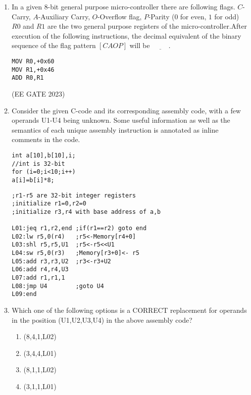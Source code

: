 \begin{enumerate}
\item In a given $8$-bit general purpose micro-controller there are following flags. $C$-Carry, $A$-Auxiliary Carry, $O$-Overflow flag, $P$-Parity ($0$ for even, $1$ for odd) $R0$ and $R1$ are the two general purpose registers of the micro-controller.After execution of the following instructions, the decimal equivalent of the binary sequence of the flag pattern $[CAOP]$ will be $\underline{\hspace{1cm}}$.\\


\begin{lstlisting}
MOV R0,+0x60
MOV R1,+0x46 
ADD R0,R1
\end{lstlisting}
    
\hfill{(EE GATE 2023)}\\


\item 
Consider the given C-code and its corresponding assembly code, with a few operands U1-U4 being unknown. Some useful information as well as the semantics of each unique assembly instruction is annotated as inline comments in the code.  

\begin{lstlisting}
int a[10],b[10],i;
//int is 32-bit
for (i=0;i<10;i++)
a[i]=b[i]*8;
\end{lstlisting}

\begin{lstlisting}
;r1-r5 are 32-bit integer registers
;initialize r1=0,r2=0
;initialize r3,r4 with base address of a,b

L01:jeq r1,r2,end ;if(r1==r2) goto end
L02:lw r5,0(r4)   ;r5<-Memory[r4+0]
L03:shl r5,r5,U1  ;r5<-r5<<U1
L04:sw r5,0(r3)   ;Memory[r3+0]<- r5
L05:add r3,r3,U2  ;r3<-r3+U2
L06:add r4,r4,U3
L07:add r1,r1,1
L08:jmp U4        ;goto U4
L09:end
\end{lstlisting}


\item Which one of the following options is a CORRECT replacement 
for operands in the position (U1,U2,U3,U4) in the above 
assembly code?

\begin{enumerate}
\item (8,4,1,L02)                      
\item (3,4,4,L01)
\item (8,1,1,L02)                             
\item (3,1,1,L01)         
\end{enumerate}

\end{enumerate}
